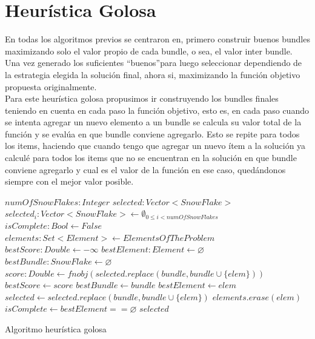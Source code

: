 \section{Heurística Golosa}
En todas los algoritmos previos se centraron en, primero construir buenos bundles maximizando solo 
el valor propio de cada bundle, o sea, el valor inter bundle. Una vez generado los suficientes 
\textquotedblleft buenos\textquotedblright  para luego seleccionar dependiendo de la 
estrategia elegida la solución final, ahora si, maximizando la función objetivo propuesta 
originalmente.\\
Para este heurística golosa propusimos ir construyendo los bundles finales teniendo en cuenta en 
cada paso la función objetivo, esto es, en cada paso cuando se intenta agregar un nuevo elemento a 
un bundle se calcula su valor total de la función y se evalúa en que bundle conviene agregarlo. 
Esto se repite para todos los items, haciendo que cuando tengo que agregar un nuevo ítem a la 
solución ya calculé para todos los items que no se encuentran en la solución en que bundle conviene 
agregarlo y cual es el valor de la función en ese caso, quedándonos siempre con el mejor valor 
posible.
\begin{algorithm}[H]
\begin{algorithmic}[1]
\REQUIRE $numOfSnowFlakes:Integer$
\ENSURE $selected:Vector<SnowFlake>$
\STATE $selected_{i}:Vector<SnowFlake> \leftarrow \emptyset_{0\leq i<numOfSnowFlakes}$
\STATE $isComplete:Bool \leftarrow False$
\STATE $elements:Set<Element> \leftarrow ElementsOfTheProblem$
\STATE $bestScore:Double \leftarrow -\infty$
\STATE $bestElement:Element \leftarrow \varnothing$
\STATE $bestBundle:SnowFlake \leftarrow \varnothing$
\STATE $score:Double \leftarrow fn obj(selected.replace(bundle, bundle \cup \{elem\}))$
\STATE $bestScore \leftarrow score$
\STATE $bestBundle \leftarrow bundle$
\STATE $bestElement \leftarrow elem$
\ENDIF
\ENDIF
\ENDFOR
\ENDFOR
\STATE $selected \leftarrow selected.replace(bundle, bundle \cup \{elem\})$
\STATE $elements.erase(elem)$
\STATE $isComplete \leftarrow bestElement == \varnothing$
\ENDWHILE
\RETURN $selected$
\end{algorithmic}
\caption{Algoritmo heurística golosa}\label{alg:algHeuGol}
\end{algorithm}
